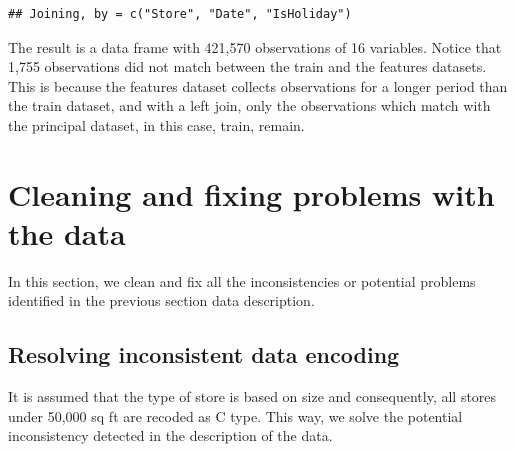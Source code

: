\documentclass[11pt,]{article}
\newenvironment{Shaded}{\begin{snugshade}}{\end{snugshade}}
\newcommand{\DataTypeTok}[1]{\textcolor[rgb]{0.13,0.29,0.53}{{#1}}}
\newcommand{\DecValTok}[1]{\textcolor[rgb]{0.00,0.00,0.81}{{#1}}}
\newcommand{\StringTok}[1]{\textcolor[rgb]{0.31,0.60,0.02}{{#1}}}
\newcommand{\CommentTok}[1]{\textcolor[rgb]{0.56,0.35,0.01}{\textit{{#1}}}}
\newcommand{\NormalTok}[1]{{#1}}
\begin{document}
\begin{verbatim}
## Joining, by = c("Store", "Date", "IsHoliday")
\end{verbatim}

The result is a data frame with 421,570 observations of 16 variables.
Notice that 1,755 observations did not match between the train and the
features datasets. This is because the features dataset collects
observations for a longer period than the train dataset, and with a left
join, only the observations which match with the principal dataset, in
this case, train, remain.

\section{Cleaning and fixing problems with the
data}\label{cleaning-and-fixing-problems-with-the-data}

In this section, we clean and fix all the inconsistencies or potential
problems identified in the previous section data description.

\subsection{Resolving inconsistent data
encoding}\label{resolving-inconsistent-data-encoding}

It is assumed that the type of store is based on size and consequently,
all stores under 50,000 sq ft are recoded as C type. This way, we solve
the potential inconsistency detected in the description of the data.

\begin{Shaded}
\end{Shaded}
\end{document}
